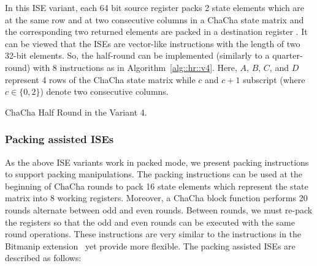 In this ISE variant, each 64 bit source register packs 2 state elements which are at the same row and at two consecutive columns in a ChaCha state matrix and the corresponding two returned elements are packed in a destination register . It can be viewed that the ISEs are vector-like instructions with the length of two 32-bit elements. So, the half-round can be implemented (similarly to a quarter-round) with 8 instructions as in Algorithm~\ref{alg::hr::v4}. Here, $A$, $B$, $C$, and $D$ represent 4 rows of the ChaCha state matrix while $c$ and $c+1$ subscript (where $c \in\{0,2\}$) denote two consecutive columns.  

\begin{algorithm}
\BlankLine
{}
\caption{ChaCha Half Round in the Variant 4.}
\label{alg::hr::v4}
\end{algorithm}

\subsubsection{Packing assisted ISEs}
As the above ISE variants work in packed mode, we present packing instructions to support packing manipulations.
The packing instructions can be used at the beginning of ChaCha rounds to pack 16 state elements which represent the state matrix into 8 working registers. 
Moreover, a ChaCha block function performs 20 rounds alternate between odd and even rounds. Between rounds, we must re-pack the registers so that the odd and even rounds can be executed with the same round operations. These instructions are very similar to the  instructions in the Bitmanip extension~\cite{riscv:bitmanip:draft} yet provide more flexible. The packing assisted ISEs are described as follows:

